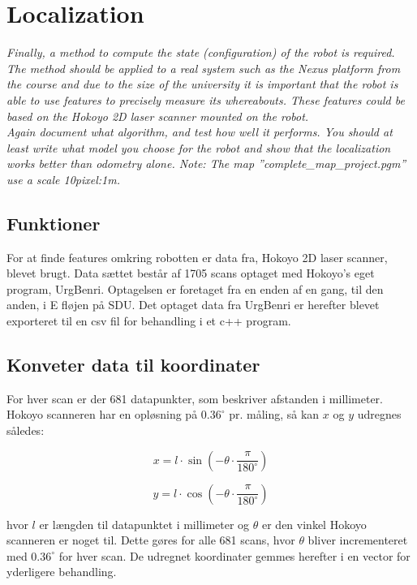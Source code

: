 \section{Localization}
\label{sec:loc}
\textit{Finally, a method to compute the state (configuration) of the robot is required. The method should be applied to a real system such as the Nexus platform from the course and due to the size of the university it is important that the robot is able to use features to precisely measure its whereabouts. These features could be based on the Hokoyo 2D laser scanner mounted on the robot.\\
Again document what algorithm, and test how well it performs. You should at least write what model you choose for the robot and show that the localization works better than odometry alone.
Note: The map ”complete\_map\_project.pgm” use a scale 10pixel:1m.}

\subsection{Funktioner}
For at finde features omkring robotten er data fra, Hokoyo 2D laser scanner, blevet brugt. Data sættet består af 1705 scans optaget med Hokoyo's eget program, UrgBenri. Optagelsen er foretaget fra en enden af en gang, til den anden, i E fløjen på SDU. Det optaget data fra UrgBenri er herefter blevet exporteret til en csv fil for behandling i et c++ program. 

\subsection{Konveter data til koordinater}
For hver scan er der 681 datapunkter, som beskriver afstanden i millimeter. Hokoyo scanneren har en opløsning på $0.36^\circ$ pr. måling, så kan $x$ og $y$ udregnes således:

\begin{equation}
x=l\cdot \sin\left(-\theta\cdot \frac{\pi}{180^\circ}\right)
\end{equation}

\begin{equation}
y=l\cdot \cos\left(-\theta\cdot \frac{\pi}{180^\circ}\right)
\end{equation}

hvor $l$ er længden til datapunktet i millimeter og $\theta$ er den vinkel Hokoyo scanneren er noget til. Dette gøres for alle 681 scans, hvor $\theta$ bliver incrementeret med $ 0.36^\circ$ for hver scan. De udregnet koordinater gemmes herefter i en vector for yderligere behandling. 

